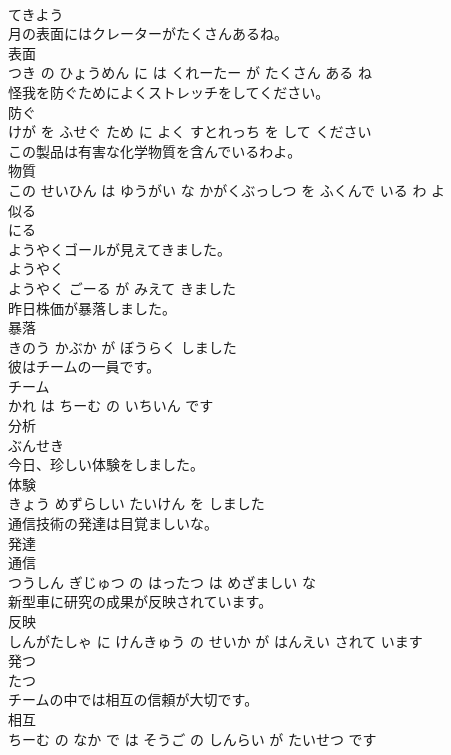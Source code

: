 \documentclass[8pt]{extreport}
\begin{document}
\begin{CJK}{UTF8}{min}
\\	てきよう		
\\	月の表面にはクレーターがたくさんあるね。	
\\	表面 
\\	つき の ひょうめん に は くれーたー が たくさん ある ね			
\\	怪我を防ぐためによくストレッチをしてください。	
\\	防ぐ 
\\	けが を ふせぐ ため に よく すとれっち を して ください			
\\	この製品は有害な化学物質を含んでいるわよ。	
\\	物質 
\\	この せいひん は ゆうがい な かがくぶっしつ を ふくんで いる わ よ			
\\	似る	
\\	にる		
\\	ようやくゴールが見えてきました。	
\\	ようやく 
\\	ようやく ごーる が みえて きました			
\\	昨日株価が暴落しました。	
\\	暴落 
\\	きのう かぶか が ぼうらく しました			
\\	彼はチームの一員です。	
\\	チーム 
\\	かれ は ちーむ の いちいん です			
\\	分析	
\\	ぶんせき		
\\	今日、珍しい体験をしました。	
\\	体験 
\\	きょう めずらしい たいけん を しました			
\\	通信技術の発達は目覚ましいな。	
\\	発達 
\\	通信 
\\	つうしん ぎじゅつ の はったつ は めざましい な			
\\	新型車に研究の成果が反映されています。	
\\	反映 
\\	しんがたしゃ に けんきゅう の せいか が はんえい されて います			
\\	発つ	
\\	たつ		
\\	チームの中では相互の信頼が大切です。	
\\	相互 
\\	ちーむ の なか で は そうご の しんらい が たいせつ です			

\end{CJK}
\end{document}
